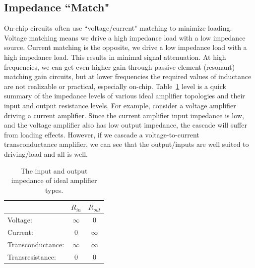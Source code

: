 \subsection{Impedance ``Match"}
On-chip circuits often use ``voltage/current" matching to minimize loading.  Voltage matching means we drive a high impedance load with a low impedance source.  Current matching is the opposite, we drive a low impedance load with a high impedance load.  This results in minimal signal attenuation.  At high frequencies, we can get even higher gain through passive element (resonant) matching gain circuits, but at lower frequencies the required values of inductance are not realizable or practical, especially on-chip.
Table~\ref{tab:imp} level is a quick summary of the impedance levels of various ideal amplifier topologies and their input and output resistance levels.   For example, consider a voltage amplifier driving a current amplifier.  Since the current amplifier input impedance is low, and the voltage amplifier also has low output impedance, the cascade will suffer from loading effects.  However, if we cascade a voltage-to-current transconductance amplifier, we can see that the output/inputs are well suited to driving/load and all is well.
    \begin{table}[tb]
        \begin{center}
        \begin{tabular}{|l|c|c|}
        \hline
          &  $R_{in}$ &  $R_{out}$ \\
        \hline
        Voltage: & $\infty$ &  $0$ \\
        Current: & $0$  &  $\infty$ \\
        Transconductance: & $\infty$ &  $\infty$ \\
        Transresistance: & $0$ &  $0$ \\
        \hline
        \end{tabular}
        \end{center}
        \caption{The input and output impedance of ideal amplifier types.
        \label{tab:imp}} 
    \end{table}
